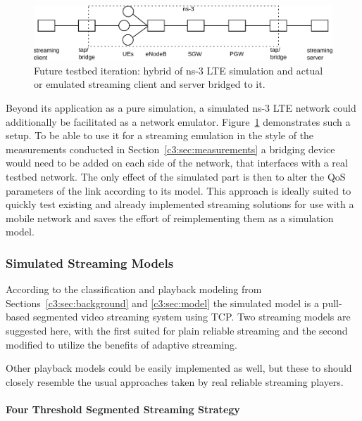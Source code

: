 \begin{figure}[htb]
	\centering
	\includegraphics[width=1.0\textwidth]{images/streaming-hybrid.pdf}
	\caption{Future testbed iteration: hybrid of ns-3 LTE simulation and actual or emulated streaming client and server bridged to it.}
\label{c6:fig:streaming-hybrid}
\end{figure}

Beyond its application as a pure simulation, a simulated ns-3 \gls{LTE} network could additionally be facilitated as a network emulator. Figure~\ref{c6:fig:streaming-hybrid} demonstrates such a setup. To be able to use it for a streaming emulation in the style of the measurements conducted in Section~\ref{c3:sec:measurements} a bridging device would need to be added on each side of the network, that interfaces with a real testbed network. The only effect of the simulated part is then to alter the \gls{QoS} parameters of the link according to its model. This approach is ideally suited to quickly test existing and already implemented streaming solutions for use with a mobile network and saves the effort of reimplementing them as a simulation model.


\subsubsection{Simulated Streaming Models}

According to the classification and playback modeling from Sections~\ref{c3:sec:background} and \ref{c3:sec:model} the simulated model is a pull-based segmented video streaming system using \gls{TCP}. Two streaming models are suggested here, with the first suited for plain reliable streaming and the second modified to utilize the benefits of adaptive streaming.

Other playback models could be easily implemented as well, but these to should closely resemble the usual approaches taken by real reliable streaming players.


\paragraph{Four Threshold Segmented Streaming Strategy}

